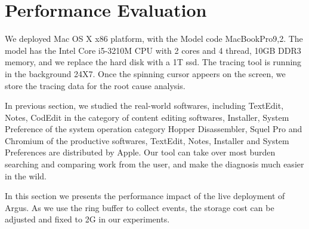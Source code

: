 \section{Performance Evaluation}
We deployed \xxx Mac OS X x86 platform, with the Model code MacBookPro9,2.  The
model has the Intel Core i5-3210M CPU with 2 cores and 4 thread, 10GB DDR3
memory, and we replace the hard disk with a 1T ssd.  The tracing tool is
running in the background 24X7.  Once the spinning cursor appeers on the
screen, we store the tracing data for the root cause analysis.

In previous section, we studied the real-world softwares, including TextEdit,
Notes, CodEdit in the category of content editing softwares, Installer, System
Preference of the system operation category Hopper Disassembler, Squel Pro and
Chromium of the productive softwares, TextEdit, Notes, Installer and System
Preferences are distributed by Apple.  
Our tool can take over most burden searching and comparing work from the user,
and make the diagnosis much easier in the wild.

In this section we presents the performance impact of the live deployment of Argus.
As we use the ring buffer to collect events, the storage cost can be adjusted
and fixed to 2G in our experiments.
